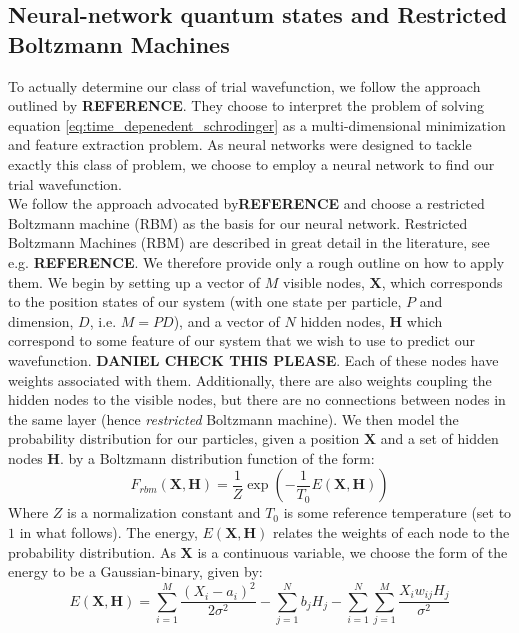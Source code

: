 \documentclass[a4paper, 10pt]{article}
\begin{document}
	\subsection{Neural-network quantum states and Restricted Boltzmann Machines}
	To actually determine our class of trial wavefunction, we follow the approach outlined by \textbf{REFERENCE}. They choose to interpret the problem of solving equation \ref{eq:time_depenedent_schrodinger} as a multi-dimensional minimization and feature extraction problem. As neural networks were designed to tackle exactly this class of problem, we choose to employ a neural network to find our trial wavefunction.\\
	\linebreak
	We follow the approach advocated by\textbf{REFERENCE} and choose a restricted Boltzmann machine (RBM) as the basis for our neural network. Restricted Boltzmann Machines (RBM) are described in great detail in the literature, see e.g. \textbf{REFERENCE}. We therefore provide only a rough outline on how to apply them. We begin by setting up a vector of $M$ visible nodes, $\mathbf{X}$, which corresponds to the position states of our system (with one state per particle, $P$ and dimension, $D$, i.e. $M=PD$), and a vector of $N$ hidden nodes, $\mathbf{H}$ which correspond to some feature of our system that we wish to use to predict our wavefunction. \textbf{DANIEL CHECK THIS PLEASE}. Each of these nodes have weights associated with them. Additionally, there are also weights coupling the hidden nodes to the visible nodes, but there are no connections between nodes in the same layer (hence \textit{restricted} Boltzmann machine). We then model the probability distribution for our particles, given a position $\mathbf{X}$ and a set of hidden nodes $\mathbf{H}$. by a Boltzmann distribution function of the form:
	\begin{equation}
	F_{rbm}(\mathbf{X}, \mathbf{H})=\frac{1}{Z}\exp \left(-\frac{1}{T_0}E(\mathbf{X},\mathbf{H})\right)
	\end{equation}
	Where $Z$ is a normalization constant and $T_0$ is some reference temperature (set to $1$ in what follows). The energy, $E(\boldsymbol{X}, \boldsymbol{H})$ relates the weights of each node to the probability distribution. As $\mathbf{X}$ is a continuous variable, we choose the form of the energy to be a Gaussian-binary, given by:
	\begin{equation}
	E(\mathbf{X}, \mathbf{H})=\sum_{i=1}^{M}\frac{\left(X_i-a_i\right)^2}{2\sigma^2}-\sum_{j=1}^N b_j H_j -\sum_{i=1}^{N}\sum_{j=1}^{M}\frac{X_iw_{ij}H_j}{\sigma^2}
	\end{equation}
\end{document}
